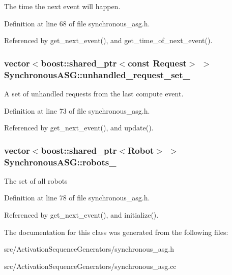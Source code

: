 The time the next event will happen. 

Definition at line 68 of file synchronous\_\-asg.h.

Referenced by get\_\-next\_\-event(), and get\_\-time\_\-of\_\-next\_\-event().\hypertarget{class_synchronous_a_s_g_decb1886c61bad1814a2d76f03b6021c}{
\subsubsection[unhandled\_\-request\_\-set\_\-]{\setlength{\rightskip}{0pt plus 5cm}vector$<$boost::shared\_\-ptr$<$const {\bf Request}$>$ $>$ {\bf SynchronousASG::unhandled\_\-request\_\-set\_\-}}}
\label{class_synchronous_a_s_g_decb1886c61bad1814a2d76f03b6021c}


A set of unhandled requests from the last compute event. 

Definition at line 73 of file synchronous\_\-asg.h.

Referenced by get\_\-next\_\-event(), and update().\hypertarget{class_synchronous_a_s_g_a2a7e5be2f90c3e875db299d27895346}{
\subsubsection[robots\_\-]{\setlength{\rightskip}{0pt plus 5cm}vector$<$boost::shared\_\-ptr$<$Robot$>$ $>$ {\bf SynchronousASG::robots\_\-}}}
\label{class_synchronous_a_s_g_a2a7e5be2f90c3e875db299d27895346}


The set of all robots 

Definition at line 78 of file synchronous\_\-asg.h.

Referenced by get\_\-next\_\-event(), and initialize().

The documentation for this class was generated from the following files:\begin{CompactItemize}
\item 
src/ActivationSequenceGenerators/synchronous\_\-asg.h\item 
src/ActivationSequenceGenerators/synchronous\_\-asg.cc\end{CompactItemize}
